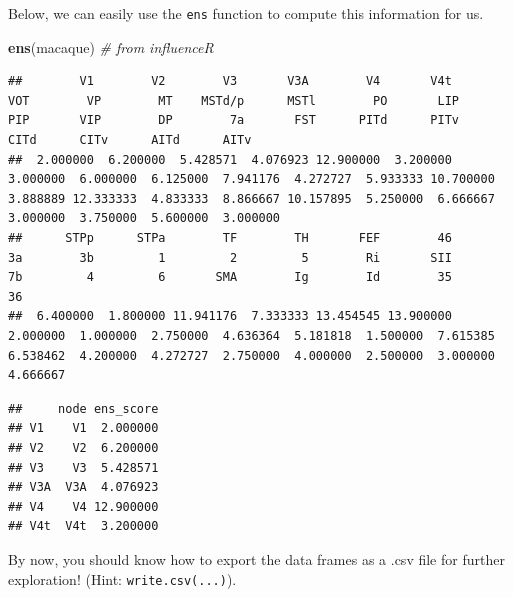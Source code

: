 \documentclass[
]{book}
\newenvironment{Shaded}{\begin{snugshade}}{\end{snugshade}}
\newcommand{\AttributeTok}[1]{\textcolor[rgb]{0.13,0.29,0.53}{#1}}
\newcommand{\CommentTok}[1]{\textcolor[rgb]{0.56,0.35,0.01}{\textit{#1}}}
\newcommand{\FunctionTok}[1]{\textcolor[rgb]{0.13,0.29,0.53}{\textbf{#1}}}
\newcommand{\NormalTok}[1]{#1}
\newcommand{\OtherTok}[1]{\textcolor[rgb]{0.56,0.35,0.01}{#1}}
\newcommand{\SpecialCharTok}[1]{\textcolor[rgb]{0.81,0.36,0.00}{\textbf{#1}}}
\begin{document}
Below, we can easily use the \texttt{ens} function to compute this information for us.

\begin{Shaded}
\begin{Highlighting}[]
\FunctionTok{ens}\NormalTok{(macaque) }\CommentTok{\# from influenceR}
\end{Highlighting}
\end{Shaded}

\begin{verbatim}
##        V1        V2        V3       V3A        V4       V4t       VOT        VP        MT    MSTd/p      MSTl        PO       LIP       PIP       VIP        DP        7a       FST      PITd      PITv      CITd      CITv      AITd      AITv 
##  2.000000  6.200000  5.428571  4.076923 12.900000  3.200000  3.000000  6.000000  6.125000  7.941176  4.272727  5.933333 10.700000  3.888889 12.333333  4.833333  8.866667 10.157895  5.250000  6.666667  3.000000  3.750000  5.600000  3.000000 
##      STPp      STPa        TF        TH       FEF        46        3a        3b         1         2         5        Ri       SII        7b         4         6       SMA        Ig        Id        35        36 
##  6.400000  1.800000 11.941176  7.333333 13.454545 13.900000  2.000000  1.000000  2.750000  4.636364  5.181818  1.500000  7.615385  6.538462  4.200000  4.272727  2.750000  4.000000  2.500000  3.000000  4.666667
\end{verbatim}

\begin{Shaded}
\end{Shaded}

\begin{verbatim}
##     node ens_score
## V1    V1  2.000000
## V2    V2  6.200000
## V3    V3  5.428571
## V3A  V3A  4.076923
## V4    V4 12.900000
## V4t  V4t  3.200000
\end{verbatim}

By now, you should know how to export the data frames as a .csv file for further exploration! (Hint: \texttt{write.csv(...)}).
\end{document}
